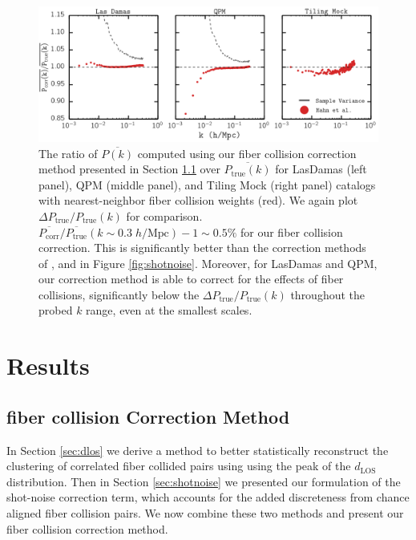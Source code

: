 \documentclass{emulateapj}
\begin{document}
\begin{figure}
\begin{center}
\includegraphics[scale=0.55]{fcpaper_pk_peakshotnoise_mpfit_comp.png} 
\caption{The ratio of $\overline{P(k)}$ computed using our fiber collision correction method presented in Section \ref{sec:apply} over $\overline{P_\mathrm{true}(k)}$ for LasDamas (left panel), QPM (middle panel), and Tiling Mock (right panel) catalogs with nearest-neighbor fiber collision weights (red). We again plot $\Delta P_\mathrm{true}/P_\mathrm{true}(k)$ for comparison. $\overline{P_\mathrm{corr}}/\overline{P_\mathrm{true}}(k \sim 0.3 \; h/\mathrm{Mpc})-1 \sim 0.5\%$ for our fiber collision correction. This is significantly better than the correction methods of \cite{Anderson:2012aa}, \cite{Beutler:2014aa} and \cite{Gil-Marin:2014aa} in Figure \ref{fig:shotnoise}. Moreover, for LasDamas and QPM, our correction method is able to correct for the effects of fiber collisions, significantly below the $\Delta P_\mathrm{true}/P_\mathrm{true}(k)$ throughout the probed $k$ range, even at the smallest scales. }\label{fig:peaksn}
\end{center}
\end{figure}
\section{Results} \label{sec:results}
\subsection{fiber collision Correction Method} \label{sec:apply}
In Section \ref{sec:dlos} we derive a method to better statistically reconstruct the clustering of correlated fiber collided pairs using using the peak of the $d_\mathrm{LOS}$ distribution. Then in Section \ref{sec:shotnoise} we presented our formulation of the shot-noise correction term, which accounts for the added discreteness from chance aligned fiber collision pairs. We now combine these two methods and present our fiber collision correction method. 
\end{document}
